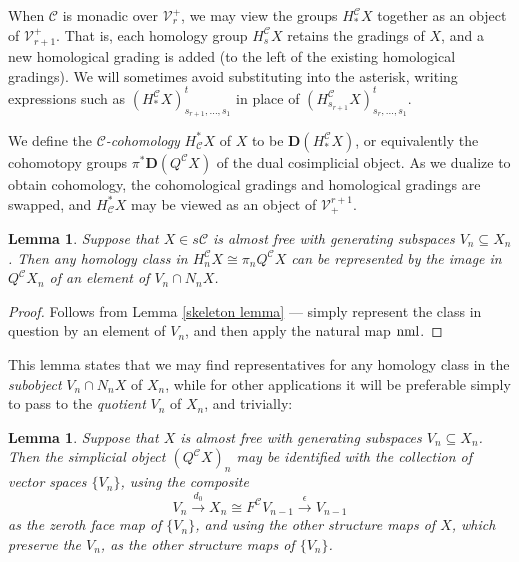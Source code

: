 \documentclass[11pt]{amsart} \renewcommand{\baselinestretch}{1.2}
\theoremstyle{plain}
\newtheorem{lem}[thm]{Lemma}
\theoremstyle{definition}
\renewcommand{\to}{\longrightarrow}
\newcommand{\calV}{\mathcal{V}}
\newcommand{\calc}{\mathcal{C}}
\newcommand{\vect}[2]{\calV^{#1}_{#2}}
\newcommand{\epi}{{\,\makebox[0cm][l]{\ensuremath\to}\to{}}}
\newcommand{\dual}{\mathbf{D}}
\begin{document}
\begin{Conventions and notation}
When $\calc$ is monadic over $\vect{+}{r}$, we may view the groups $H_*^{\calc}X$ together as an object of $\vect{+}{r+1}$. That is, each homology group $H_s^\calc X$ retains the gradings of $X$, and a new homological grading is added (to the left of the existing homological gradings). We will sometimes avoid substituting into the asterisk, writing expressions such as $(H_*^\calc X)_{s_{r+1},\ldots,s_1}^t$ in place of $(H_{s_{r+1}}^\calc X)_{s_r,\ldots,s_1}^t$.

We define the \emph{$\calc$-cohomology} $H^*_\calc X$ of $X$ to be $\dual(H_*^\calc X)$, or equivalently the cohomotopy groups $\pi^*\dual(Q^\calc X)$ of the dual cosimplicial object.  As we dualize to obtain cohomology, the cohomological gradings and homological gradings are swapped, and $H^*_{\calc}X$ may be viewed as an object of $\vect{r+1}{+}$. 


\begin{lem}
\label{lemma on homology class repd by normalized generator}
Suppose that $X\in s\calc$ is almost free with generating subspaces $V_n\subseteq X_n$. Then any homology class in $H_n^{\calc}X\cong \pi_nQ^{\calc}X$ can be represented by the image in $Q^{\calc}X_n$ of an element of $V_n\cap N_nX$.
\end{lem}
\begin{proof}
Follows from Lemma \ref{skeleton lemma} --- simply represent the class in question by an element of $V_n$, and then apply the natural map $\textup{nml}$. %
\end{proof}
\noindent This lemma states that we may find representatives for any homology class in the \emph{subobject} $V_n\cap N_nX$ of $X_n$, while for other applications it will be preferable simply to pass to the \emph{quotient} $V_n$ of $X_n$, and trivially: %
\begin{lem}
\label{identify almost free indecs with gens}
Suppose that $X$ is almost free with generating subspaces $V_n\subseteq X_n$. Then the simplicial object $(Q^{\calc}X)_{n}$ may be identified with the collection of vector spaces $\{V_n\}$, using  the composite
\[V_{n}\overset{d_0}{\to}X_n\cong F^{\calc}V_{n-1}\overset{\epsilon}{\to}V_{n-1}\]
as the zeroth face map of $\{V_n\}$, and using the other structure maps of $X$, which preserve the $V_{n}$, as the other structure maps of $\{V_n\}$.
\end{lem}




\end{Conventions and notation}
\end{document}
